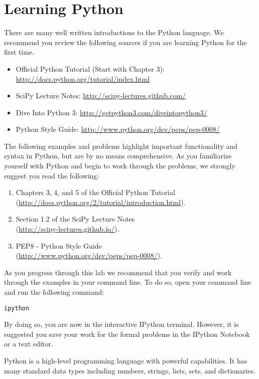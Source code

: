 \section*{Learning Python}
There are many well written introductions to the Python language.
We recommend you review the following sources if you are learning Python for the
first time.

\begin{itemize}
\item Official Python Tutorial (Start with Chapter 3): 
\url{http://docs.python.org/tutorial/index.html} 
\item SciPy Lecture Notes: \url{http://scipy-lectures.github.com/}
\item Dive Into Python 3: \url{http://getpython3.com/diveintopython3/}
\item Python Style Guide: \url{http://www.python.org/dev/peps/pep-0008/}
\end{itemize}

The following examples and problems highlight important functionality
and syntax in Python, but are by no means comprehensive.
As you familiarize yourself with Python and begin to work through the problems,  
we strongly suggest you read the following:
\begin{enumerate}
\item Chapters 3, 4, and 5 of the Official Python Tutorial \\
        (\url{http://docs.python.org/2/tutorial/introduction.html}).
\item Section 1.2 of the SciPy Lecture Notes \\
        (\url{http://scipy-lectures.github.io/}).
\item PEP8 - Python Style Guide \\
        (\url{http://www.python.org/dev/peps/pep-0008/}).
\end{enumerate}


As you progress through this lab we recommend that you verify and work 
through the examples in your command line. 
To do so, open your command line and run the following command: 
\begin{lstlisting}
ipython
\end{lstlisting}
By doing so, you are now in the interactive IPython terminal.
However, it is suggested you save your work for the formal problems in the 
IPython Notebook or a text editor. 

Python is a high-level programming language with powerful capabilities. 
It has many standard data types including numbers, strings, lists, sets, and dictionaries. 

